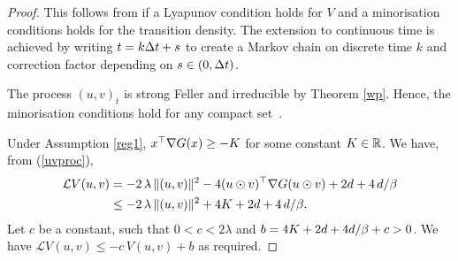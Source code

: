\documentclass[11pt, twoside]{report}
\begin{document}
\begin{proof} This follows from \cite[Theorem 2.25]{Lelievre2016-hx} if  a Lyapunov condition holds for $V$  and a minorisation conditions holds for the transition density. The extension to continuous time  \cite[Equation 2.77]{Lelievre2016-hx} is achieved by writing $t=k {\Delta t} +s$ to create a  Markov chain on discrete time $k$ and correction factor depending on $s\in(0,{\Delta t})$.

The process $(u,v)_t$ is strong Feller and irreducible by Theorem \ref{wp}. Hence,  the minorisation conditions hold for any compact set~\cite[Lemma 2.3]{mattingly2002ergodicity}. 

 Under Assumption \ref{reg1},  $x^\top \nabla G(x) \ge -K $ for some constant $K \in \mathbb{R}$.   We have, from (\ref{uvproc}),
    \begin{align*}
    \mathcal L V(u,v) 
    &= -2\,\lambda\,\|(u,v)\|^2  - 4(u \odot v)^\top \nabla G(u \odot v) + 2d+4\,d/\beta\\&
    \leq -2\,\lambda\,\|(u,v)\|^2  +4K+ 2d+4\,d/\beta.\end{align*}
    Let $c$ be a constant, such that $0 < c < 2\lambda$ and $b=4K+2d+4d/\beta  + c > 0$. We  have $\mathcal L V(u,v) \leq -c\,V(u,v) + b$ as required. 
\end{proof}
\end{document}
